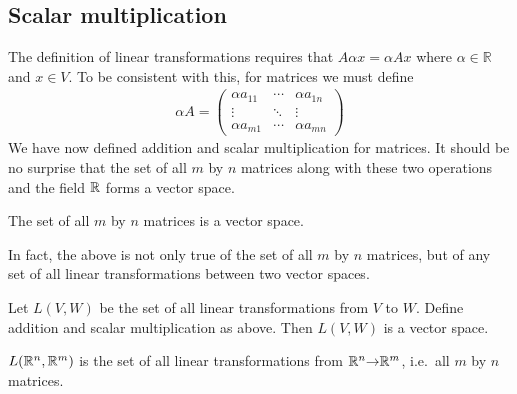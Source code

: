 \subsection{Scalar multiplication}
The definition of linear transformations requires that $A \alpha x =
\alpha A x$ where $\alpha \in \mathbb{R}$ and $x \in V$. To be
consistent with this, for matrices we must define
\begin{align*}
  \alpha A = \begin{pmatrix} \alpha a_{11} & \cdots &
    \alpha a_{1n} \\ \vdots & \ddots & \vdots \\ \alpha a_{m1} & \cdots &
    \alpha a_{mn} \end{pmatrix}
\end{align*}
We have now defined addition and scalar multiplication for
matrices. It should be no surprise that the set of all $m$ by $n$
matrices along with these two operations and the field $\mathbb{R}$ forms a
vector space. 
\begin{example}
  The set of all $m$ by $n$ matrices is a vector space. 
\end{example}
In fact, the above is not only true of the set of all
$m$ by $n$ matrices, but of any set of all linear transformations
between two vector spaces.
\begin{example}
  Let $L(V,W)$ be the set of all linear transformations from $V$ to
  $W$. Define addition and scalar multiplication as above. Then 
  $L(V,W)$ is a vector space.
\end{example}
$L(\mathbb{R}^n, \mathbb{R}^m)$ is the set of all linear transformations from $\mathbb{R}^n
{\rightarrow} \mathbb{R}^m$, i.e.\ all $m$ by $n$ matrices. 

